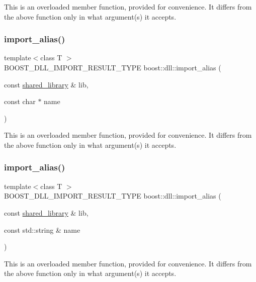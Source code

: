 This is an overloaded member function, provided for convenience. It differs from the above function only in what argument(s) it accepts. \mbox{\label{a00254_file_aefeda3de57b4871b66bd42ee1199e6fe}} 
\subsubsection{\texorpdfstring{import\+\_\+alias()}{import\_alias()}\hspace{0.1cm}{\footnotesize\ttfamily [3/6]}}
{\footnotesize\ttfamily template$<$class T $>$ \\
B\+O\+O\+S\+T\+\_\+\+D\+L\+L\+\_\+\+I\+M\+P\+O\+R\+T\+\_\+\+R\+E\+S\+U\+L\+T\+\_\+\+T\+Y\+PE boost\+::dll\+::import\+\_\+alias (\begin{DoxyParamCaption}\item[{const \hyperlink{a01708}{shared\+\_\+library} \&}]{lib,  }\item[{const char $\ast$}]{name }\end{DoxyParamCaption})}

This is an overloaded member function, provided for convenience. It differs from the above function only in what argument(s) it accepts. \mbox{\label{a00254_file_a30560963e2e72d0314053673c30b137e}} 
\subsubsection{\texorpdfstring{import\+\_\+alias()}{import\_alias()}\hspace{0.1cm}{\footnotesize\ttfamily [4/6]}}
{\footnotesize\ttfamily template$<$class T $>$ \\
B\+O\+O\+S\+T\+\_\+\+D\+L\+L\+\_\+\+I\+M\+P\+O\+R\+T\+\_\+\+R\+E\+S\+U\+L\+T\+\_\+\+T\+Y\+PE boost\+::dll\+::import\+\_\+alias (\begin{DoxyParamCaption}\item[{const \hyperlink{a01708}{shared\+\_\+library} \&}]{lib,  }\item[{const std\+::string \&}]{name }\end{DoxyParamCaption})}

This is an overloaded member function, provided for convenience. It differs from the above function only in what argument(s) it accepts. \mbox{\label{a00254_file_ae6a8129836f1674c746a4af58c7e7104}} 
